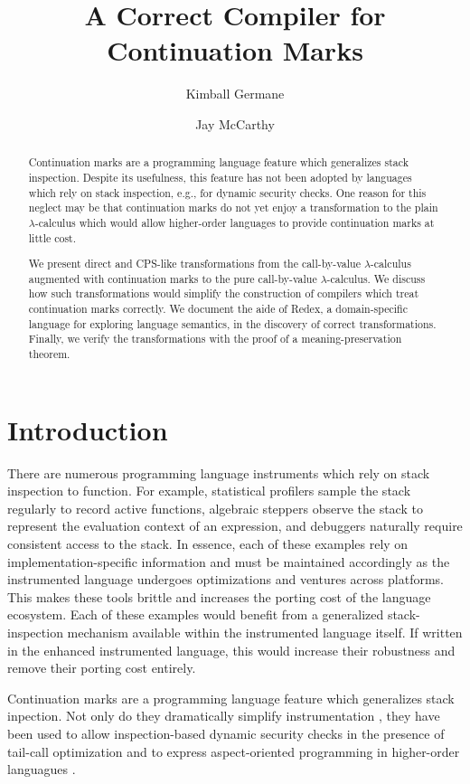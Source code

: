 \documentclass{llncs}
\title{A Correct Compiler for Continuation Marks}
\author{Kimball Germane \and Jay McCarthy}
\institute{Brigham Young University}
\begin{document}
\maketitle

\begin{abstract}
Continuation marks are a programming language feature which generalizes stack inspection. Despite its usefulness, this feature has not been adopted by languages which rely on stack inspection, e.g., for dynamic security checks. One reason for this neglect may be that continuation marks do not yet enjoy a transformation to the plain $\lambda$-calculus which would allow higher-order languages to provide continuation marks at little cost.

We present direct and CPS-like transformations from the call-by-value $\lambda$-calculus augmented with continuation marks to the pure call-by-value $\lambda$-calculus. We discuss how such transformations would simplify the construction of compilers which treat continuation marks correctly. We document the aide of Redex, a domain-specific language for exploring language semantics, in the discovery of correct transformations. Finally, we verify the transformations with the proof of a meaning-preservation theorem.
\end{abstract}

\section{Introduction}

There are numerous programming language instruments which rely on stack inspection to function. For example, statistical profilers sample the stack regularly to record active functions, algebraic steppers observe the stack to represent the evaluation context of an expression, and debuggers naturally require consistent access to the stack. In essence, each of these examples rely on implementation-specific information and must be maintained accordingly as the instrumented language undergoes optimizations and ventures across platforms. This makes these tools brittle and increases the porting cost of the language ecosystem. Each of these examples would benefit from a generalized stack-inspection mechanism available within the instrumented language itself. If written in the enhanced instrumented language, this would increase their robustness and remove their porting cost entirely.

Continuation marks \cite{clements2006portable} are a programming language feature which generalizes stack inpection. Not only do they dramatically simplify instrumentation \cite{clements2001modeling}, they have been used to allow inspection-based dynamic security checks in the presence of tail-call optimization \cite{clements2004tail} and to express aspect-oriented programming in higher-order languagues \cite{tucker2003pointcuts}.
\end{document}
